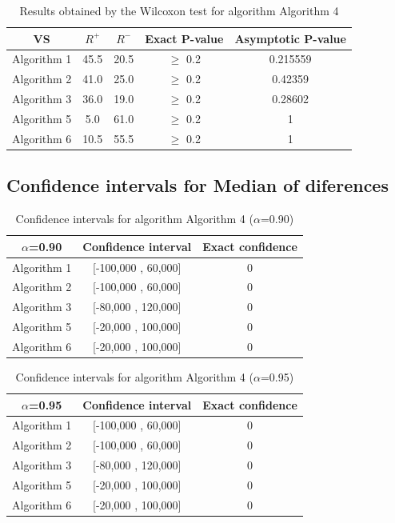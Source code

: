 \documentclass[a4paper,10pt]{article}
\begin{document}
\begin{table}[!htp]
\centering\small
\begin{tabular}{
|c|c|c|c|c|}
\hline
 VS & $R^{+}$ & $R^{-}$ & Exact P-value & Asymptotic P-value \\ \hline 
Algorithm 1 & 45.5 & 20.5 & $\geq$ 0.2 & 0.215559\\ \hline 
Algorithm 2 & 41.0 & 25.0 & $\geq$ 0.2 & 0.42359\\ \hline 
Algorithm 3 & 36.0 & 19.0 & $\geq$ 0.2 & 0.28602\\ \hline 
Algorithm 5 & 5.0 & 61.0 & $\geq$ 0.2 & 1\\ \hline 
Algorithm 6 & 10.5 & 55.5 & $\geq$ 0.2 & 1\\ \hline 

\end{tabular}
\caption{Results obtained by the Wilcoxon test for algorithm Algorithm 4}
\end{table}

\subsection{Confidence intervals for Median of diferences}

\begin{table}[!htp]
\centering\small
\begin{tabular}{
|c|c|c|}
\hline
 $\alpha$=0.90 & Confidence interval & Exact confidence \\ \hline 
Algorithm 1 & [-100,000 , 60,000] & 0\\ \hline 
Algorithm 2 & [-100,000 , 60,000] & 0\\ \hline 
Algorithm 3 & [-80,000 , 120,000] & 0\\ \hline 
Algorithm 5 & [-20,000 , 100,000] & 0\\ \hline 
Algorithm 6 & [-20,000 , 100,000] & 0\\ \hline 

\end{tabular}
\caption{Confidence intervals for algorithm Algorithm 4 ($\alpha$=0.90)}
\end{table}
\begin{table}[!htp]
\centering\small
\begin{tabular}{
|c|c|c|}
\hline
 $\alpha$=0.95 & Confidence interval & Exact confidence \\ \hline 
Algorithm 1 & [-100,000 , 60,000] & 0\\ \hline 
Algorithm 2 & [-100,000 , 60,000] & 0\\ \hline 
Algorithm 3 & [-80,000 , 120,000] & 0\\ \hline 
Algorithm 5 & [-20,000 , 100,000] & 0\\ \hline 
Algorithm 6 & [-20,000 , 100,000] & 0\\ \hline 

\end{tabular}
\caption{Confidence intervals for algorithm Algorithm 4 ($\alpha$=0.95)}
\end{table}
\end{document}
